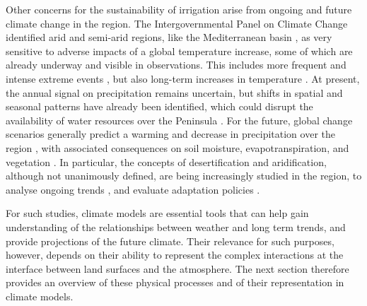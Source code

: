 Other concerns for the sustainability of irrigation arise from ongoing and future climate change in the region. The Intergovernmental Panel on Climate Change 
\citep{RN1} identified arid and semi-arid regions, like the Mediterranean basin \citep{giorgi_climate_2006}, as very sensitive to adverse impacts of a global temperature increase, some of which are already underway and visible in observations.
This includes more frequent and intense extreme events \citep{dominguez-castro_high_2019}, but also long-term increases in temperature \citep{pena-angulo_seasonal_2021,gonzalez-hidalgo_variability_2022}. At present, the annual signal on precipitation remains uncertain, but shifts in spatial and seasonal patterns have already been identified, which could disrupt the availability of water resources over the Peninsula \citep{gonzalez-hidalgo_seasonal_2024}. 
For the future, global change scenarios generally predict a warming and decrease in precipitation over the region \citep{pereira_temperature_2021}, with associated consequences on soil moisture, evapotranspiration, and vegetation \citep{RN1, nunes_effects_2023}.
In particular, the concepts of desertification and aridification, although not unanimously defined, are being increasingly studied in the region, to analyse ongoing trends \citep{paniagua_aridity_2019, begueria_aridity_2025}, and evaluate adaptation policies \citep{van_leeuwen_evolution_2019, MITECO2022}.

For such studies, climate models are essential tools that can help gain understanding of the relationships between weather and long term trends, and provide projections of the future climate. Their relevance for such purposes, however, depends on their ability to represent the complex interactions at the interface between land surfaces and the atmosphere. The next section therefore provides an overview of these physical processes and of their representation in climate models.

